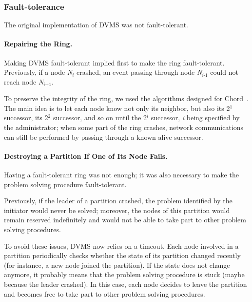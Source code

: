 \subsubsection{Fault-tolerance}

The original implementation of DVMS was not fault-tolerant.


\paragraph{Repairing the Ring.}

Making DVMS fault-tolerant implied first to make the ring fault-tolerant.
Previously, if a node \emph{N\(_{\textit{i}}\)} crashed, an event passing through
node \emph{N\(_{\textit{i-1}}\)} could not reach node \emph{N\(_{\textit{i+1}}\)}.

To preserve the integrity of the ring, we used the algorithms
designed for Chord~\cite{stoica:2001:sigcomm01}.
%
The main idea is to let each node know not only its neighbor, but also its
2\(^{\textit{1}}\) successor, its 2\(^{\textit{2}}\) successor, and so on until the
2\(^{\textit{i}}\) successor, \emph{i} being specified by the administrator;
%
when some part of the ring crashes, network communications can still be
performed by passing through a known alive successor.


\paragraph{Destroying a Partition If One of Its Node Fails.}

Having a fault-tolerant ring was not enough; it was also necessary to make the
problem solving procedure fault-tolerant.

Previously, if the leader of a partition crashed, the problem identified by the
initiator would never be solved; moreover, the nodes of this partition would
remain reserved indefinitely and would not be able to take part to other problem
solving procedures.

To avoid these issues, DVMS now relies on a timeout.  Each node involved in a
partition periodically checks whether the state of its partition changed
recently (for instance, a new node joined the partition).
%
If the state does not change anymore, it probably means that the problem solving
procedure is stuck (maybe because the leader crashed).
%
In this case, each node decides to leave the partition and becomes free to take
part to other problem solving procedures.
